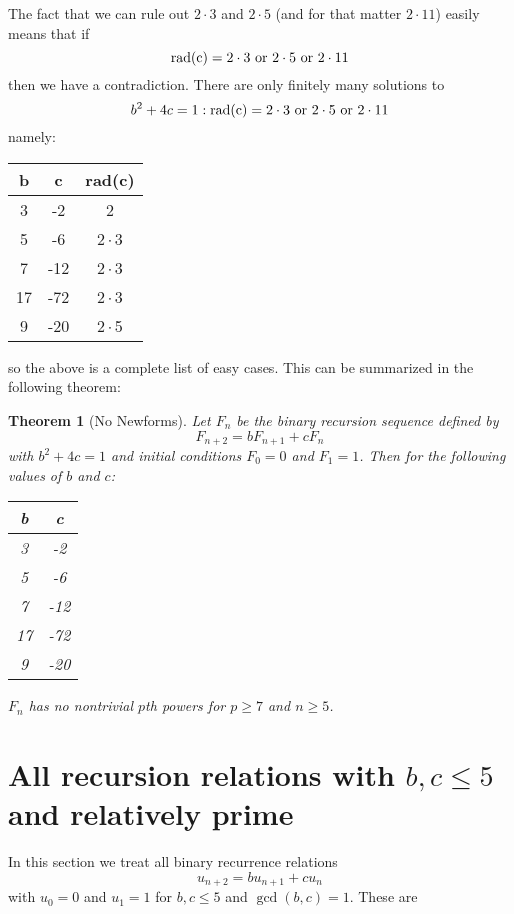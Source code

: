\documentclass[12pt]{article}
\newtheorem{ithm}{Theorem}
\newcommand{\rad}{\rm rad}
\begin{document}
The fact that we can rule out $2 \cdot 3$ and $2 \cdot 5$ (and for that matter $2 \cdot 11$) easily means that if 
\[ \rad(c) = 2 \cdot 3 \text{ or } 2 \cdot 5 \text{ or }2 \cdot 11 \]
then we have a contradiction.  There are only finitely many solutions to
\[ b^2 +4c = 1 : \rad(c) = 2 \cdot 3 \text{ or } 2 \cdot 5 \text{ or }2 \cdot 11 \]
namely:
\begin{center}
\begin{tabular}{c c c}
b & c & \rad(c) \\ \hline \hline
3 & -2 & 2  \\
5 & -6 & $2\cdot$3  \\
7 & -12 & $2\cdot$3  \\
17 & -72 & $2\cdot$3 \\
9 & -20 & $2\cdot$5
\end{tabular}
\end{center}
so the above is a complete list of easy cases.  This can be summarized in the following theorem:

\begin{ithm}[No Newforms]
Let $F_n$ be the binary recursion sequence defined by 
\[ F_{n+2} = bF_{n+1} +cF_n \]
with $b^2+4c = 1$ and initial conditions $F_0 = 0$ and $F_1=1$.  Then for the following values of $b$ and $c$:
\begin{center}
\begin{tabular}{c | c }
b & c \\  \hline \hline
3 & -2 \\
5 & -6  \\
7 & -12 \\
17 & -72  \\
9 & -20 \\ \hline \hline
\end{tabular}
\end{center}
$F_n$ has no nontrivial $p$th powers for $p \geq 7$ and $n \geq 5$.
\end{ithm}



\section{All recursion relations with $b,c \leq 5$ and relatively prime}

In this section we treat all binary recurrence relations
\[ u_{n+2} = b u_{n+1} + c u_n \]
with $u_0 = 0$ and $u_1=1$ for $b,c \leq 5$ and $\gcd(b,c)=1$.
These are
\end{document}
